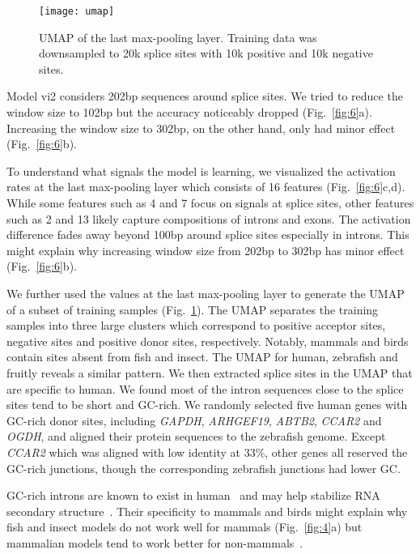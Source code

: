 \documentclass[webpdf,contemporary,large,namedate]{oup-authoring-template}%
\begin{document}
\begin{figure}[bt]
\texttt{[image: umap]}
\caption{UMAP of the last max-pooling layer.
Training data was downsampled to 20k splice sites with 10k positive and 10k negative sites.
}\label{fig:umap}
\end{figure}

Model vi2 considers 202bp sequences around splice sites.
We tried to reduce the window size to 102bp but the accuracy noticeably dropped (Fig.~\ref{fig:6}a).
Increasing the window size to 302bp, on the other hand, only had minor effect (Fig.~\ref{fig:6}b).

To understand what signals the model is learning, we visualized the activation rates at the last max-pooling layer which consists of 16 features (Fig.~\ref{fig:6}c,d).
While some features such as 4 and 7 focus on signals at splice sites,
other features such as 2 and 13 likely capture compositions of introns and exons.
The activation difference fades away beyond 100bp around splice sites especially in introns.
This might explain why increasing window size from 202bp to 302bp has minor effect (Fig.~\ref{fig:6}b).

We further used the values at the last max-pooling layer to generate the UMAP of a subset of training samples (Fig.~\ref{fig:umap}).
The UMAP separates the training samples into three large clusters which correspond to
positive acceptor sites, negative sites and positive donor sites, respectively.
Notably, mammals and birds contain sites absent from fish and insect.
The UMAP for human, zebrafish and fruitly reveals a similar pattern.
We then extracted splice sites in the UMAP that are specific to human.
We found most of the intron sequences close to the splice sites tend to be short and GC-rich.
We randomly selected five human genes with GC-rich donor sites, including \emph{GAPDH}, \emph{ARHGEF19}, \emph{ABTB2}, \emph{CCAR2} and \emph{OGDH},
and aligned their protein sequences to the zebrafish genome.
Except \emph{CCAR2} which was aligned with low identity at 33\%,
other genes all reserved the GC-rich junctions, though the corresponding zebrafish junctions had lower GC.

GC-rich introns are known to exist in human~\citep{Wang:2011aa}
and may help stabilize RNA secondary structure~\citep{Zhang:2011aa}.
Their specificity to mammals and birds might explain
why fish and insect models do not work well for mammals (Fig.~\ref{fig:4}a)
but mammalian models tend to work better for non-mammals~\citep{McCue:2024aa}.
\end{document}
